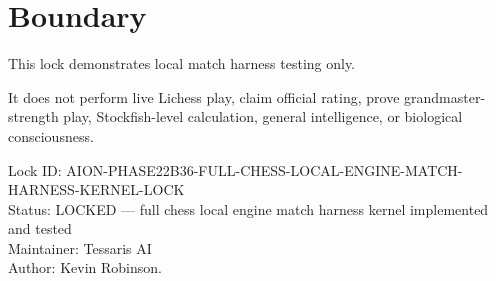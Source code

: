 \documentclass[11pt,a4paper]{article}
\begin{document}
\section{Boundary}

This lock demonstrates local match harness testing only.

It does not perform live Lichess play, claim official rating, prove grandmaster-strength play, Stockfish-level calculation, general intelligence, or biological consciousness.

\bigskip

\noindent
Lock ID: AION-PHASE22B36-FULL-CHESS-LOCAL-ENGINE-MATCH-HARNESS-KERNEL-LOCK\\
Status: LOCKED --- full chess local engine match harness kernel implemented and tested\\
Maintainer: Tessaris AI\\
Author: Kevin Robinson.
\end{document}
